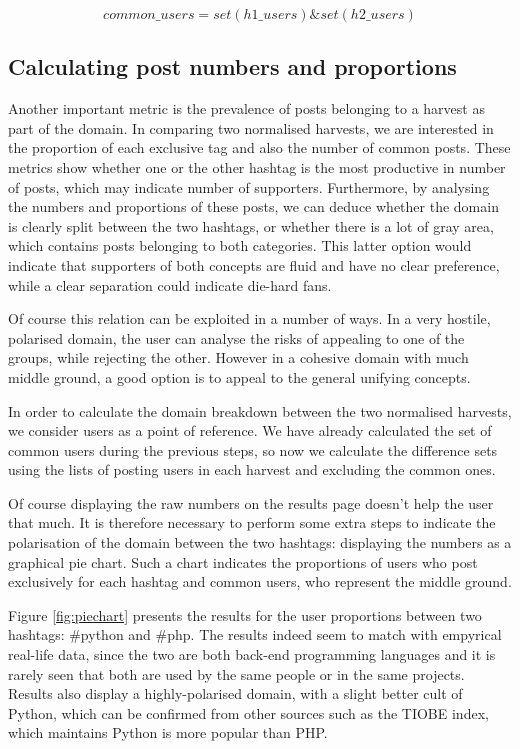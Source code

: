 \[common\_users = set(h1\_users) \& set(h2\_users)\]

\subsection{Calculating post numbers and proportions}
Another important metric is the prevalence of posts belonging to a harvest as part of the domain. In comparing two normalised harvests, we are interested in the proportion of each exclusive tag and also the number of common posts. These metrics show whether one or the other hashtag is the most productive in number of posts, which may indicate number of supporters. Furthermore, by analysing the numbers and proportions of these posts, we can deduce whether the domain is clearly split between the two hashtags, or whether there is a lot of gray area, which contains posts belonging to both categories. This latter option would indicate that supporters of both concepts are fluid and have no clear preference, while a clear separation could indicate die-hard fans.

Of course this relation can be exploited in a number of ways. In a very hostile, polarised domain, the user can analyse the risks of appealing to one of the groups, while rejecting the other. However in a cohesive domain with much middle ground, a good option is to appeal to the general unifying concepts.

In order to calculate the domain breakdown between the two normalised harvests, we consider users as a point of reference. We have already calculated the set of common users during the previous steps, so now we calculate the difference sets using the lists of posting users in each harvest and excluding the common ones.

Of course displaying the raw numbers on the results page doesn't help the user that much. It is therefore necessary to perform some extra steps to indicate the polarisation of the domain between the two hashtags: displaying the numbers as a graphical pie chart. Such a chart indicates the proportions of users who post exclusively for each hashtag and common users, who represent the middle ground.

Figure \ref{fig:piechart} presents the results for the user proportions between two hashtags: \#python and \#php. The results indeed seem to match with empyrical real-life data, since the two are both back-end programming languages and it is rarely seen that both are used by the same people or in the same projects. Results also display a highly-polarised domain, with a slight better cult of Python, which can be confirmed from other sources such as the TIOBE index, which maintains Python is more popular than PHP.

